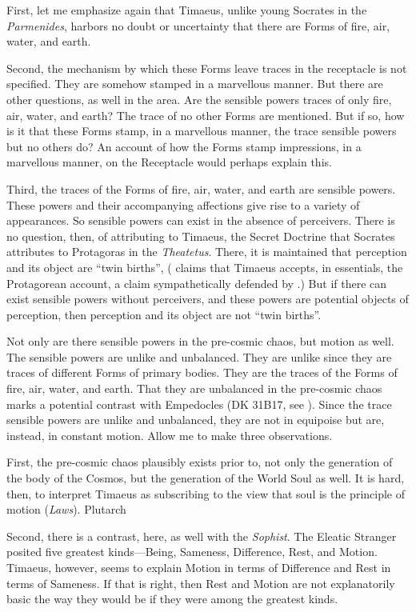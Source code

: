 First, let me emphasize again that Timaeus, unlike young Socrates in the \emph{Parmenides}, harbors no doubt or uncertainty that there are Forms of fire, air, water, and earth. 

Second, the mechanism by which these Forms leave traces in the receptacle is not specified. They are somehow stamped in a marvellous manner. But there are other questions, as well in the area. Are the sensible powers traces of only fire, air, water, and earth? The trace of no other Forms are mentioned. But if so, how is it that these Forms stamp, in a marvellous manner, the trace sensible powers but no others do? An account of how the Forms stamp impressions, in a marvellous manner, on the Receptacle would perhaps explain this.

Third, the traces of the Forms of fire, air, water, and earth are sensible powers. These powers and their accompanying affections give rise to a variety of appearances. So sensible powers can exist in the absence of perceivers. There is no question, then, of attributing to Timaeus, the Secret Doctrine that Socrates attributes to Protagoras in the \emph{Theatetus}. There, it is maintained that perception and its object are ``twin births'', (\citealt{Cornford:1935fk} claims that Timaeus accepts, in essentials, the Protagorean account, a claim sympathetically defended by \citealt{OBrien:1984ji}.) But if there can exist sensible powers without perceivers, and these powers are potential objects of perception, then perception and its object are not ``twin births''.

Not only are there sensible powers in the pre-cosmic chaos, but motion as well. The sensible powers are unlike and unbalanced. They are unlike since they are traces of different Forms of primary bodies. They are the traces of the Forms of fire, air, water, and earth. That they are unbalanced in the pre-cosmic chaos marks a potential contrast with Empedocles (DK 31B17, see \citealt[199 n2]{Cornford:1935fk}). Since the trace sensible powers are unlike and unbalanced, they are not in equipoise but are, instead, in constant motion. Allow me to make three observations.

First, the pre-cosmic chaos plausibly exists prior to, not only the generation of the body of the Cosmos, but the generation of the World Soul as well. It is hard, then, to interpret Timaeus as subscribing to the view that soul is the principle of motion (\emph{Laws}). Plutarch

Second, there is a contrast, here, as well with the \emph{Sophist}. The Eleatic Stranger posited five greatest kinds---Being, Sameness, Difference, Rest, and Motion. Timaeus, however, seems to explain Motion in terms of Difference and Rest in terms of Sameness. If that is right, then Rest and Motion are not explanatorily basic the way they would be if they were among the greatest kinds.  


